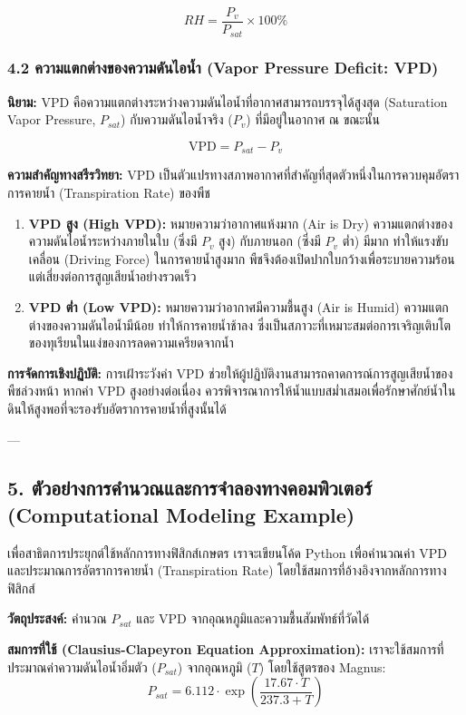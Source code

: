 \documentclass[11pt,a4paper,openany]{report}
\begin{document}
$$RH = \frac{P_v}{P_{sat}} \times 100\%$$


\subsubsection{4.2 ความแตกต่างของความดันไอน้ำ (Vapor Pressure Deficit: VPD)}


\textbf{นิยาม:}
VPD คือความแตกต่างระหว่างความดันไอน้ำที่อากาศสามารถบรรจุได้สูงสุด (Saturation Vapor Pressure, $P_{sat}$) กับความดันไอน้ำจริง ($P_v$) ที่มีอยู่ในอากาศ ณ ขณะนั้น

$$\text{VPD} = P_{sat} - P_v$$


\textbf{ความสำคัญทางสรีรวิทยา:}
VPD เป็นตัวแปรทางสภาพอากาศที่สำคัญที่สุดตัวหนึ่งในการควบคุมอัตราการคายน้ำ (Transpiration Rate) ของพืช

\begin{enumerate}
  \item \textbf{VPD สูง (High VPD):} หมายความว่าอากาศแห้งมาก (Air is Dry) ความแตกต่างของความดันไอน้ำระหว่างภายในใบ (ซึ่งมี $P_v$ สูง) กับภายนอก (ซึ่งมี $P_v$ ต่ำ) มีมาก ทำให้แรงขับเคลื่อน (Driving Force) ในการคายน้ำสูงมาก พืชจึงต้องเปิดปากใบกว้างเพื่อระบายความร้อน แต่เสี่ยงต่อการสูญเสียน้ำอย่างรวดเร็ว
  \item \textbf{VPD ต่ำ (Low VPD):} หมายความว่าอากาศมีความชื้นสูง (Air is Humid) ความแตกต่างของความดันไอน้ำมีน้อย ทำให้การคายน้ำช้าลง ซึ่งเป็นสภาวะที่เหมาะสมต่อการเจริญเติบโตของทุเรียนในแง่ของการลดความเครียดจากน้ำ
\end{enumerate}


\textbf{การจัดการเชิงปฏิบัติ:}
การเฝ้าระวังค่า VPD ช่วยให้ผู้ปฏิบัติงานสามารถคาดการณ์การสูญเสียน้ำของพืชล่วงหน้า หากค่า VPD สูงอย่างต่อเนื่อง ควรพิจารณาการให้น้ำแบบสม่ำเสมอเพื่อรักษาศักย์น้ำในดินให้สูงพอที่จะรองรับอัตราการคายน้ำที่สูงนั้นได้

---

\subsection{5. ตัวอย่างการคำนวณและการจำลองทางคอมพิวเตอร์ (Computational Modeling Example)}


เพื่อสาธิตการประยุกต์ใช้หลักการทางฟิสิกส์เกษตร เราจะเขียนโค้ด Python เพื่อคำนวณค่า VPD และประมาณการอัตราการคายน้ำ (Transpiration Rate) โดยใช้สมการที่อ้างอิงจากหลักการทางฟิสิกส์

\textbf{วัตถุประสงค์:} คำนวณ $P_{sat}$ และ VPD จากอุณหภูมิและความชื้นสัมพัทธ์ที่วัดได้

\textbf{สมการที่ใช้ (Clausius-Clapeyron Equation Approximation):}
เราจะใช้สมการที่ประมาณค่าความดันไอน้ำอิ่มตัว ($P_{sat}$) จากอุณหภูมิ ($T$) โดยใช้สูตรของ Magnus:
$$P_{sat} = 6.112 \cdot \exp\left(\frac{17.67 \cdot T}{237.3 + T}\right)$$
\end{document}
